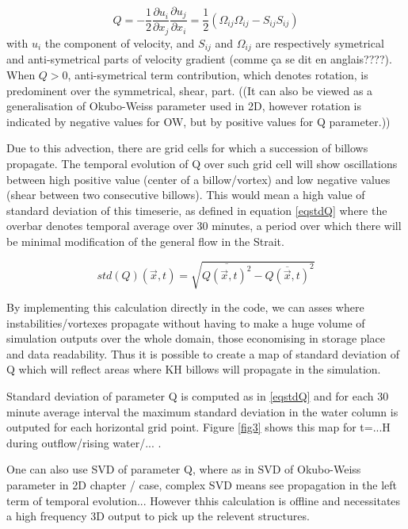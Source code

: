 \begin{equation}
Q=-\frac{1}{2} \frac{\partial u_i}{\partial x_j} \frac{\partial u_j}{\partial x_i} = \frac{1}{2} (\Omega_{ij}\Omega_{ij} - S_{ij} S_{ij})
\end{equation}
with $u_i$ the component of velocity, and $S_{ij}$ and $\Omega_{ij}$ are respectively symetrical and anti-symetrical parts of velocity gradient (comme ça se dit en anglais????). When $Q>0$, anti-symetrical term contribution, which denotes rotation, is predominent over the symmetrical, shear, part. ((It can also be viewed as a generalisation of Okubo-Weiss parameter used in 2D, however rotation is indicated by negative values for OW, but by positive values for Q parameter.))

Due to this advection, there are grid cells for which a succession of billows propagate. The temporal evolution of Q over such grid cell will show oscillations between high positive value (center of a billow/vortex) and low negative values (shear between two consecutive billows). This would mean a high value of standard deviation of this timeserie, as defined in equation \ref{eqstdQ} where the overbar denotes temporal average over 30 minutes, a period over which there will be minimal modification of the general flow in the Strait.

\begin{equation} 
\label{eqstdQ} 
    std ( Q ) (\vec{x},t)=  \sqrt{   \overline{Q (\vec{x},t)^{2}} -  \overline{Q(\vec{x},t)}^{2}       }
\end{equation}

By implementing this calculation directly in the code, we can asses where instabilities/vortexes propagate without having to make a huge volume of simulation outputs over the whole domain, those economising in storage place and data readability. Thus it is possible to create a map of standard deviation of Q which will reflect areas where KH billows will propagate in the simulation.


Standard deviation of parameter Q is computed as in \ref{eqstdQ} and for each 30 minute average interval the maximum standard deviation in the water column is outputed for each horizontal grid point. Figure \ref{fig3} shows this map for t=...H during outflow/rising water/... .

One can also use SVD of parameter Q, where as in SVD of Okubo-Weiss parameter in 2D chapter / case, complex SVD means see propagation in the left  term of temporal evolution... However thhis calculation is offline and necessitates a high frequency 3D output to pick up the relevent structures.


